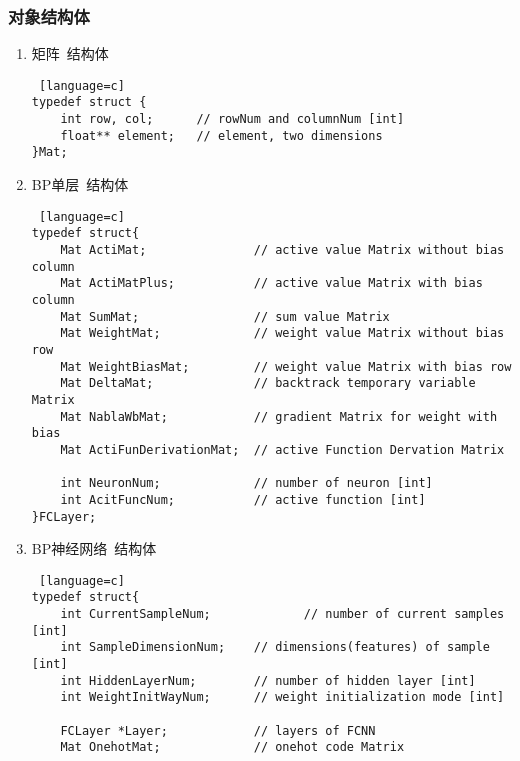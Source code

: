 \subsubsection{对象结构体}

\begin{enumerate}
  \item 矩阵~结构体
\begin{lstlisting} [language=c]
typedef struct {
	int row, col;      // rowNum and columnNum [int]
	float** element;   // element, two dimensions
}Mat;
\end{lstlisting}
  \item BP单层~结构体
\begin{lstlisting} [language=c]
typedef struct{
	Mat ActiMat;               // active value Matrix without bias column
	Mat ActiMatPlus;           // active value Matrix with bias column
	Mat SumMat;                // sum value Matrix
	Mat WeightMat;             // weight value Matrix without bias row
	Mat WeightBiasMat;         // weight value Matrix with bias row
	Mat DeltaMat;              // backtrack temporary variable Matrix
	Mat NablaWbMat;            // gradient Matrix for weight with bias
	Mat ActiFunDerivationMat;  // active Function Dervation Matrix

	int NeuronNum;             // number of neuron [int]
	int AcitFuncNum;           // active function [int]
}FCLayer;
\end{lstlisting}
  \item BP神经网络~结构体
\begin{lstlisting} [language=c]
typedef struct{
	int CurrentSampleNum;             // number of current samples [int]
	int SampleDimensionNum;    // dimensions(features) of sample [int]
	int HiddenLayerNum;        // number of hidden layer [int]
	int WeightInitWayNum;      // weight initialization mode [int]

	FCLayer *Layer;            // layers of FCNN
	Mat OnehotMat;             // onehot code Matrix


\end{lstlisting}
\end{enumerate}
